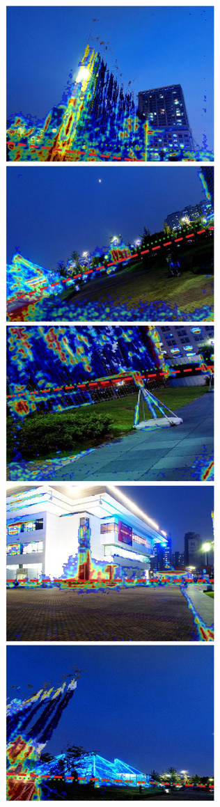 \includegraphics{sgbp/thumb/pano_ayflzrhzcccird-1.jpg}
\includegraphics{sgbp/thumb/pano_ayflzrhzcccird-2.jpg}
\includegraphics{sgbp/thumb/pano_ayflzrhzcccird-3.jpg}
\includegraphics{sgbp/thumb/pano_ayflzrhzcccird-4.jpg}
\includegraphics{sgbp/thumb/pano_ayflzrhzcccird-5.jpg}
